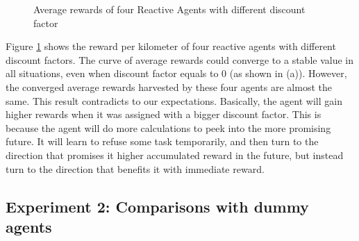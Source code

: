 \documentclass[11pt]{article}
\begin{document}
\begin{figure}[htbp]
\centering
 
%
%

%
%
 
\centering

\caption{Average rewards of four Reactive Agents with different discount factor}
\label{fig:discount_factor_comparision}
\end{figure}

Figure \ref{fig:discount_factor_comparision} shows the reward per kilometer of four reactive agents with different discount factors. The curve of average rewards could converge to a stable value in all situations, even when discount factor equals to 0 (as shown in (a)). However, the converged average rewards harvested by these four agents are almost the same. This result contradicts to our expectations. Basically, the agent will gain higher rewards when it was assigned with a bigger discount factor. This is because the agent will do more calculations to peek into the more promising future. It will learn to refuse some task temporarily, and then turn to the direction that promises it higher accumulated reward in the future, but instead turn to the direction that benefits it with immediate reward.

\subsection{Experiment 2: Comparisons with dummy agents}
\end{document}
